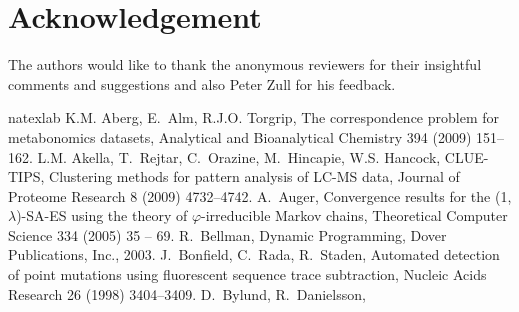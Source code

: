 \documentclass[number,1p,12pt]{elsarticle}
\begin{document}
\section*{Acknowledgement}
The authors would like to thank the anonymous reviewers for their insightful comments and suggestions and also Peter Zull for his feedback.

%

%
\begin{thebibliography}{32}
\expandafter\ifx\csname natexlab\endcsname\relax\def\natexlab#1{#1}\fi
\providecommand{\bibinfo}[2]{#2}
\ifx\xfnm\relax \def\xfnm[#1]{\unskip,\space#1}\fi
\bibinfo{author}{K.M. Aberg}, \bibinfo{author}{E.~Alm}, \bibinfo{author}{R.J.O.
  Torgrip}, \bibinfo{title}{{The correspondence problem for metabonomics
  datasets}}, \bibinfo{journal}{{Analytical and Bioanalytical Chemistry}}
  \bibinfo{volume}{{394}} (\bibinfo{year}{{2009}}) \bibinfo{pages}{{151--162}}.
\bibinfo{author}{L.M. Akella}, \bibinfo{author}{T.~Rejtar},
  \bibinfo{author}{C.~Orazine}, \bibinfo{author}{M.~Hincapie},
  \bibinfo{author}{W.S. Hancock}, \bibinfo{title}{{CLUE-TIPS, Clustering
  methods for pattern analysis of LC-MS data}}, \bibinfo{journal}{{Journal of
  Proteome Research}} \bibinfo{volume}{{8}} (\bibinfo{year}{{2009}})
  \bibinfo{pages}{{4732--4742}}.
\bibinfo{author}{A.~Auger}, \bibinfo{title}{{Convergence results for the (1,
  $\lambda$)-SA-ES using the theory of $\varphi$-irreducible Markov chains}},
  \bibinfo{journal}{Theoretical Computer Science} \bibinfo{volume}{334}
  (\bibinfo{year}{2005}) \bibinfo{pages}{35 -- 69}.
\bibinfo{author}{R.~Bellman}, \bibinfo{title}{Dynamic Programming},
  \bibinfo{publisher}{Dover Publications, Inc.}, \bibinfo{year}{2003}.
\bibinfo{author}{J.~Bonfield}, \bibinfo{author}{C.~Rada},
  \bibinfo{author}{R.~Staden}, \bibinfo{title}{{Automated detection of point
  mutations using fluorescent sequence trace subtraction}},
  \bibinfo{journal}{{Nucleic Acids Research}} \bibinfo{volume}{{26}}
  (\bibinfo{year}{{1998}}) \bibinfo{pages}{{3404--3409}}.
\bibinfo{author}{D.~Bylund}, \bibinfo{author}{R.~Danielsson},

\end{thebibliography}
\end{document}
